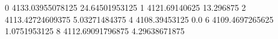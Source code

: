 0 4133.03955078125 24.64501953125
1 4121.69140625 13.296875
2 4113.42724609375 5.03271484375
4 4108.39453125 0.0
6 4109.4697265625 1.0751953125
8 4112.69091796875 4.29638671875
